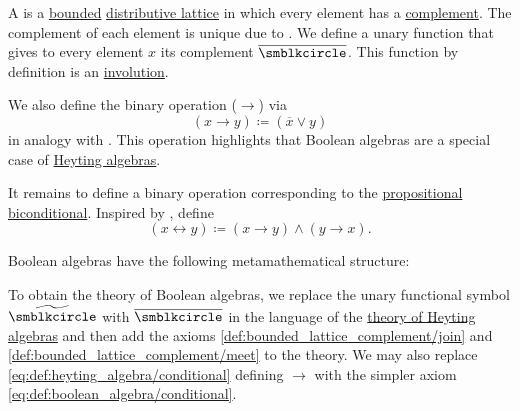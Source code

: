 \begin{definition}\label{def:boolean_algebra}
  A  is a \hyperref[def:semilattice/bounded]{bounded} \hyperref[def:semilattice/distributive_lattice]{distributive lattice} in which every element has a \hyperref[def:bounded_lattice_complement]{complement}. The complement of each element is unique due to . We define a unary function that gives to every element \( x \) its complement \( \overline \placeholder \). This function by definition is an \hyperref[def:set_with_involution]{involution}.

  \begin{thmenum}[series=def:boolean_algebra]
     We also define the binary operation  (\( \rightarrow \)) via
    \begin{equation}\label{eq:def:boolean_algebra/conditional}
      (x \rightarrow y) \coloneqq (\overline x \vee y)
    \end{equation}
    in analogy with . This operation highlights that Boolean algebras are a special case of \hyperref[thm:boolean_algebras_are_heyting_algebras]{Heyting algebras}.

     It remains to define a binary operation corresponding to the \hyperref[def:propositional_language/connectives/biconditional]{propositional biconditional}. Inspired by , define
    \begin{equation}\label{eq:def:boolean_algebra/biconditional}
      (x \leftrightarrow y) \coloneqq (x \rightarrow y) \wedge (y \rightarrow x).
    \end{equation}
  \end{thmenum}

  Boolean algebras have the following metamathematical structure:
  \begin{thmenum}[resume=def:boolean_algebra]
     To obtain the theory of Boolean algebras, we replace the unary functional symbol \( \widetilde{\placeholder} \) with \( \overline \placeholder \) in the language of the \hyperref[def:heyting_algebra/theory]{theory of Heyting algebras} and then add the axioms \eqref{def:bounded_lattice_complement/join} and \eqref{def:bounded_lattice_complement/meet} to the theory. We may also replace \eqref{eq:def:heyting_algebra/conditional} defining \( \rightarrow \) with the simpler axiom \eqref{eq:def:boolean_algebra/conditional}.


\end{thmenum}
\end{definition}
